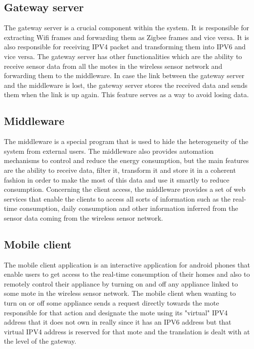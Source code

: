 \documentclass[conference]{IEEEtran}
\begin{document}
\subsection{Gateway server}
The gateway server is a crucial component within the system. It is responsible for extracting Wifi frames and forwarding them as Zigbee frames and vice versa. It is also responsible for receiving IPV4 packet and transforming them into IPV6 and vice versa. The gateway server has other functionalities which are the ability to receive sensor data from all the motes in the wireless sensor network and forwarding them to the middleware. In case the link between the gateway server and the middleware is lost, the gateway server stores the received data and sends them when the link is up again. This feature serves as a way to avoid losing data.

\subsection{Middleware}
The middleware is a special program that is used to hide the heterogeneity of the system from external users. The middleware also provides automation mechanisms to control and reduce the energy consumption, but the main features are the ability to receive data, filter it, transform it and store it in a coherent fashion in order to make the most of this data and use it smartly to reduce consumption. Concerning the client access, the middleware provides a set of web services that enable the clients to access all sorts of information such as the real-time consumption, daily consumption and other information inferred from the sensor data coming from the wireless sensor network.

\subsection{Mobile client}
The mobile client application is an interactive application for android phones that enable users to get access to the real-time consumption of their homes and also to remotely control their appliance by turning on and off any appliance linked to some mote in the wireless sensor network. The mobile client when wanting to turn on or off some appliance sends a request directly towards the mote responsible for that action and designate the mote using its "virtual" IPV4 address that it does not own in really since it has an IPV6 address but that virtual IPV4 address is reserved for that mote and the translation is dealt with at the level of the gateway.
\end{document}
